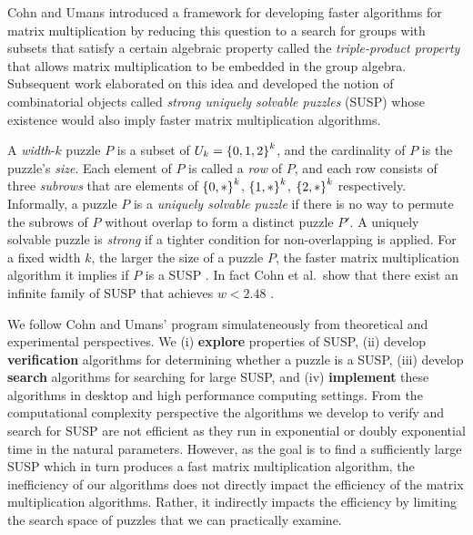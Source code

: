\documentclass[11pt]{article}
\begin{document}


Cohn and Umans \cite{cu03} introduced a framework for developing
faster algorithms for matrix multiplication by reducing this question
to a search for groups with subsets that satisfy a certain algebraic
property called the \emph{triple-product property} that allows matrix
multiplication to be embedded in the group algebra.  Subsequent work
\cite{cksu05} elaborated on this idea and developed the notion of
combinatorial objects called \emph{strong uniquely solvable puzzles}
(SUSP) whose existence would also imply faster matrix multiplication
algorithms.

A \emph{width}-$k$ puzzle $P$ is a subset of $U_k = \left\{ 0,1,2 \right\}^k$,
and the cardinality of $P$ is the puzzle's \emph{size}.  Each element
of $P$ is called a \emph{row} of $P$, and each row consists of three
\emph{subrows} that are elements of $\left\{ 0,* \right\}^k$, $\left\{ 1,* \right\}^k$,
$\left\{ 2,* \right\}^k$ respectively.  Informally, a puzzle $P$ is a
\emph{uniquely solvable puzzle} if there is no way to permute the
subrows of $P$ without overlap to form a distinct puzzle $P'$.  A
uniquely solvable puzzle is \emph{strong} if a tighter condition for
non-overlapping is applied. For a fixed width $k$, the larger the size
of a puzzle $P$, the faster matrix multiplication algorithm it implies
if $P$ is a SUSP \cite[Corollary 3.6]{cksu05}.  In fact Cohn et
al.~show that there exist an infinite family of SUSP that achieves $w
< 2.48$ \cite[Proposition 3.8]{cksu05}.


We follow Cohn and Umans' program simulateneously from theoretical and
experimental perspectives.  We (i) \textbf{explore} properties of
SUSP, (ii) develop \textbf{verification} algorithms for determining
whether a puzzle is a SUSP, (iii) develop \textbf{search} algorithms
for searching for large SUSP, and (iv) \textbf{implement} these
algorithms in desktop and high performance computing settings.  From
the computational complexity perspective the algorithms we develop to
verify and search for SUSP are not efficient as they run in
exponential or doubly exponential time in the natural parameters.
However, as the goal is to find a sufficiently large SUSP which in
turn produces a fast matrix multiplication algorithm, the inefficiency
of our algorithms does not directly impact the efficiency of the
matrix multiplication algorithms.  Rather, it indirectly impacts the
efficiency by limiting the search space of puzzles that we can
practically examine.
\end{document}
